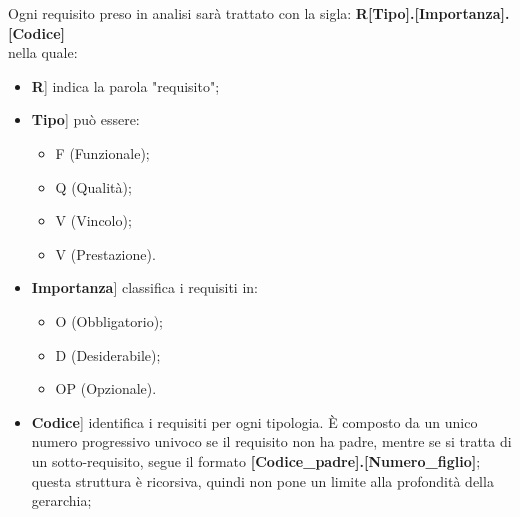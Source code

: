 \documentclass[10pt, a4paper]{article}
\begin{document}
Ogni requisito preso in analisi sarà trattato con la sigla:
\textbf{R[Tipo].[Importanza].[Codice]}\\
nella quale:
\begin{itemize}
\item \lbrack \textbf{R}] indica la parola "requisito";
\item \lbrack \textbf{Tipo}] può essere:
    \begin{itemize}
	    \item F (Funzionale);
	    \item Q (Qualità);
	    \item V (Vincolo);
        \item V (Prestazione).
    \end{itemize}
\item \lbrack \textbf{Importanza}] classifica i requisiti in:
    \begin{itemize}
        \item O (Obbligatorio);
		\item D (Desiderabile);
		\item OP (Opzionale).
    \end{itemize}
\item \lbrack \textbf{Codice}] identifica i requisiti per ogni tipologia. È composto da un unico numero progressivo univoco se il requisito non ha padre, mentre se si tratta di un sotto-requisito, segue il formato \textbf{[Codice\_padre].[Numero\_figlio]}; questa struttura è ricorsiva, quindi non pone un limite alla profondità della gerarchia;
\end{itemize}
\end{document}
